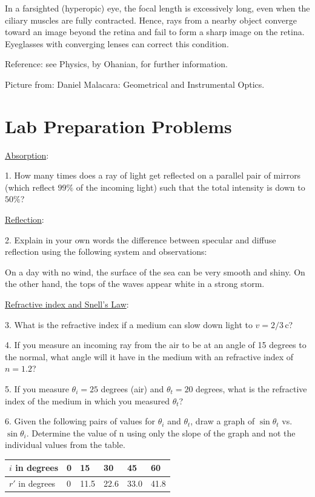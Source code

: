 In a farsighted (hyperopic) eye, the focal length is excessively long, even when the ciliary muscles are fully contracted. Hence, rays from a nearby object converge toward an image beyond the retina and fail to form a sharp image on the retina. Eyeglasses with converging lenses can correct this condition.\myskip

Reference: see Physics, by Ohanian, for further information.\myskip

Picture from: Daniel Malacara: Geometrical and Instrumental Optics.

\section{Lab Preparation Problems}

\noindent \underline{Absorption}:\myskip

1. How many times does a ray of light get reflected on a parallel pair of mirrors (which reflect $99\%$ of the incoming light) such that the total intensity is down to $50\%$? \myskip

\noindent \underline{Reflection}: \myskip

2. Explain in your own words the difference between specular and diffuse reflection using the following system and observations: \myskip

On a day with no wind, the surface of the sea can be very smooth and shiny. On the other hand, the tops of the waves appear white in a strong storm. \myskip

\noindent \underline{Refractive index and Snell's Law}:\myskip

3. What is the refractive index if a medium can slow down light to $v = 2/3\,\mathrm{c}$? \myskip

4. If you measure an incoming ray from the air to be at an angle of 15 degrees to the normal, what angle will it have in the medium with an refractive index of $n = 1.2$? \myskip

5. If you measure $\theta_{i} = 25$ degrees (air) and $\theta_{t} = 20$ degrees, what is the refractive index of the medium in which you measured $\theta_{t}$?\myskip

6. Given the following pairs of values for $\theta_{i}$ and $\theta_{t}$, draw a graph of $\sin \theta_{t}$ vs. $\sin \theta_{i}$. Determine the value of n using only the slope of the graph and not the individual values from the table.
\begin{table}[h]
    \centering
    \begin{tabular}{|l|l|l|l|l|l|}
        \hline
        $i$ in degrees & 0 & 15 & 30 & 45 & 60 \\ \hline
        $r'$ in degrees & 0 & 11.5 & 22.6 & 33.0 & 41.8 \\ \hline
    \end{tabular}
\end{table}

